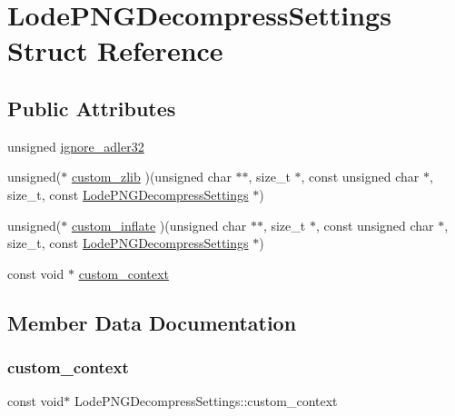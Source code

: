 \hypertarget{struct_lode_p_n_g_decompress_settings}{}\section{Lode\+P\+N\+G\+Decompress\+Settings Struct Reference}
\label{struct_lode_p_n_g_decompress_settings}
\subsection*{Public Attributes}
\begin{DoxyCompactItemize}
\item 
unsigned \mbox{\hyperlink{struct_lode_p_n_g_decompress_settings_afab4b919650b51b4d2f175a60ed6c580}{ignore\+\_\+adler32}}
\item 
unsigned($\ast$ \mbox{\hyperlink{struct_lode_p_n_g_decompress_settings_a9dd432e46330dbd2ce3ef1929c64337d}{custom\+\_\+zlib}} )(unsigned char $\ast$$\ast$, size\+\_\+t $\ast$, const unsigned char $\ast$, size\+\_\+t, const \mbox{\hyperlink{struct_lode_p_n_g_decompress_settings}{Lode\+P\+N\+G\+Decompress\+Settings}} $\ast$)
\item 
unsigned($\ast$ \mbox{\hyperlink{struct_lode_p_n_g_decompress_settings_a023aa5946c99934d40280850a4d8b204}{custom\+\_\+inflate}} )(unsigned char $\ast$$\ast$, size\+\_\+t $\ast$, const unsigned char $\ast$, size\+\_\+t, const \mbox{\hyperlink{struct_lode_p_n_g_decompress_settings}{Lode\+P\+N\+G\+Decompress\+Settings}} $\ast$)
\item 
const void $\ast$ \mbox{\hyperlink{struct_lode_p_n_g_decompress_settings_a66e3608b541c64bb275c0ac1a80c3ec6}{custom\+\_\+context}}
\end{DoxyCompactItemize}


\subsection{Member Data Documentation}
\mbox{\label{struct_lode_p_n_g_decompress_settings_a66e3608b541c64bb275c0ac1a80c3ec6}} 
\subsubsection{\texorpdfstring{custom\_context}{custom\_context}}
{\footnotesize\ttfamily const void$\ast$ Lode\+P\+N\+G\+Decompress\+Settings\+::custom\+\_\+context}

